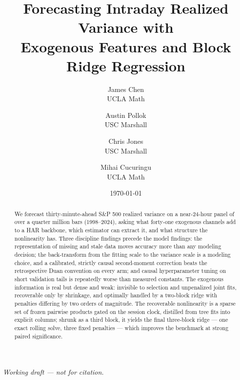 \documentclass[12pt]{article}
\title{Forecasting Intraday Realized Variance with\\Exogenous Features and Block Ridge Regression}
\author{
James Chen\\{\small UCLA Math}
\and
Austin Pollok\\{\small USC Marshall}
\and
Chris Jones\\{\small USC Marshall}
\and
Mihai Cucuringu\\{\small UCLA Math}
}
\date{\today}
\begin{document}
\maketitle

\begin{center}
\textit{Working draft --- not for citation.}
\end{center}

\begin{abstract}
We forecast thirty-minute-ahead S\&P 500 realized variance on a
near-24-hour panel of over a quarter million bars (1998--2024), asking
what forty-one exogenous channels add to a HAR backbone, which estimator
can extract it, and what structure the nonlinearity has. Three
discipline findings precede the model findings: the representation of
missing and stale data moves accuracy more than any modeling decision;
the back-transform from the fitting scale to the variance scale is a
modeling choice, and a calibrated, strictly causal second-moment
correction beats the retrospective Duan convention on every arm; and
causal hyperparameter tuning on short validation tails is repeatedly
worse than measured constants. The exogenous information is real but
dense and weak: invisible to selection and unpenalized joint fits,
recoverable only by shrinkage, and optimally handled by a two-block
ridge with penalties differing by two orders of magnitude. The
recoverable nonlinearity is a sparse set of frozen pairwise products
gated on the session clock, distilled from tree fits into explicit
columns; shrunk as a third block, it yields the final three-block ridge
--- one exact rolling solve, three fixed penalties --- which improves
the benchmark at strong paired significance.
\end{abstract}








\end{document}
